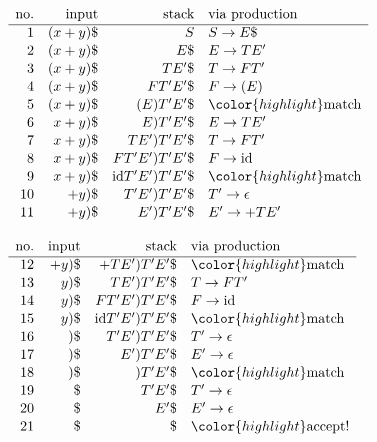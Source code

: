 \begin{minipage}[t]{0.5\textwidth}\small
$\begin{array}[t]{rrrl}
  \text{no.} & \text{input} & \text{stack} & \text{via production} \\[0.2ex]
  \hline
1 & (x+y)\$        &             S & S\to E\$             \\[0.2ex]
2 & (x+y)\$        &           E\$ & E\to TE'             \\[0.2ex]
3 & (x+y)\$        &         TE'\$ & T\to FT'             \\[0.2ex]
4 & (x+y)\$        &       FT'E'\$ & F\to (E)             \\[0.2ex]
5 & (x+y)\$        &     (E)T'E'\$ & {\color{highlight}\text{match}}         \\[0.2ex]
 6 & x+y)\$        &      E)T'E'\$ & E\to TE'             \\[0.2ex]
 7 & x+y)\$        &    TE')T'E'\$ & T\to FT'             \\[0.2ex]
 8 & x+y)\$        &  FT'E')T'E'\$ & F\to \text{id}              \\[0.2ex]
 9 & x+y)\$        & \text{id}T'E')T'E'\$ & {\color{highlight}\text{match}}         \\[0.2ex]
 10 & +y)\$        &   T'E')T'E'\$ & T'\to \epsilon       \\[0.2ex]
 11 & +y)\$        &     E')T'E'\$ & E'\to + TE'          \\[0.2ex]
\end{array}$
\end{minipage}%
\begin{minipage}[t]{0.5\textwidth}\small
$\begin{array}[t]{rrrl}
  \text{no.} & \text{input} & \text{stack} & \text{via production} \\[0.2ex]
  \hline
  12 & +y)\$        &   +TE')T'E'\$ & {\color{highlight}\text{match}}         \\[0.2ex]
  13 & y)\$        &    TE')T'E'\$ & T \to FT'            \\[0.2ex]
  14 & y)\$        &  FT'E')T'E'\$ & F \to \text{id}             \\[0.2ex]
  15 & y)\$        & \text{id}T'E')T'E'\$ & {\color{highlight}\text{match}}         \\[0.2ex]
  16 & )\$        &   T'E')T'E'\$ & T'\to \epsilon       \\[0.2ex]
  17 & )\$        &     E')T'E'\$ & E'\to \epsilon       \\[0.2ex]
  18 & )\$        &       )T'E'\$ & {\color{highlight}\text{match}}                \\[0.2ex]
  19 & \$        &        T'E'\$ & T'\to \epsilon       \\[0.2ex]
  20 & \$        &          E'\$ & E'\to \epsilon       \\[0.2ex]
  21 & \$        &            \$ & {\color{highlight}\text{accept!}}       \\[0.2ex]
\end{array}$
\end{minipage}